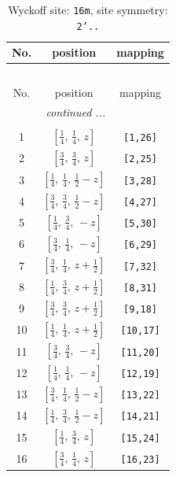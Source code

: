 \documentclass[fleqn,8pt]{jsarticle}
\begin{document}
\renewcommand{\arraystretch}{1.2}
\begin{longtable}{ccc}
\caption{Wyckoff site: {\tt 16m}, site symmetry: {\tt 2'..}}
 \\
 \hline \hline
No. & position & mapping \\ \hline \endfirsthead

\multicolumn{2}{l}{\tablename\ \thetable{}} \\
 \hline \hline
No. & position & mapping \\ \hline \endhead

 \hline \hline
\multicolumn{2}{r}{\footnotesize\it continued ...} \\ \endfoot

 \hline \hline
\multicolumn{2}{r}{} \\ \endlastfoot

1 & $\left[ \frac{1}{4},\, \frac{1}{4},\, z \right]$ & {\tt [1,26]} \\ \hline
2 & $\left[ \frac{3}{4},\, \frac{3}{4},\, z \right]$ & {\tt [2,25]} \\ \hline
3 & $\left[ \frac{1}{4},\, \frac{1}{4},\, \frac{1}{2} - z \right]$ & {\tt [3,28]} \\ \hline
4 & $\left[ \frac{3}{4},\, \frac{3}{4},\, \frac{1}{2} - z \right]$ & {\tt [4,27]} \\ \hline
5 & $\left[ \frac{1}{4},\, \frac{3}{4},\, - z \right]$ & {\tt [5,30]} \\ \hline
6 & $\left[ \frac{3}{4},\, \frac{1}{4},\, - z \right]$ & {\tt [6,29]} \\ \hline
7 & $\left[ \frac{3}{4},\, \frac{1}{4},\, z + \frac{1}{2} \right]$ & {\tt [7,32]} \\ \hline
8 & $\left[ \frac{1}{4},\, \frac{3}{4},\, z + \frac{1}{2} \right]$ & {\tt [8,31]} \\ \hline
9 & $\left[ \frac{3}{4},\, \frac{3}{4},\, z + \frac{1}{2} \right]$ & {\tt [9,18]} \\ \hline
10 & $\left[ \frac{1}{4},\, \frac{1}{4},\, z + \frac{1}{2} \right]$ & {\tt [10,17]} \\ \hline
11 & $\left[ \frac{3}{4},\, \frac{3}{4},\, - z \right]$ & {\tt [11,20]} \\ \hline
12 & $\left[ \frac{1}{4},\, \frac{1}{4},\, - z \right]$ & {\tt [12,19]} \\ \hline
13 & $\left[ \frac{3}{4},\, \frac{1}{4},\, \frac{1}{2} - z \right]$ & {\tt [13,22]} \\ \hline
14 & $\left[ \frac{1}{4},\, \frac{3}{4},\, \frac{1}{2} - z \right]$ & {\tt [14,21]} \\ \hline
15 & $\left[ \frac{1}{4},\, \frac{3}{4},\, z \right]$ & {\tt [15,24]} \\ \hline
16 & $\left[ \frac{3}{4},\, \frac{1}{4},\, z \right]$ & {\tt [16,23]} \\
\end{longtable}
\end{document}

